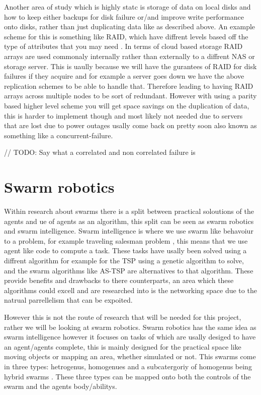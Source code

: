 \documentclass{UoYCSproject}
\begin{document}
Another area of study which is highly statc is storage of data on local disks and how to keep either backups for disk failure or/and improve write performance onto disks, rather than just duplicating data like as described above.
An example scheme for this is something like RAID, which have diffrent levels based off the type of 	attributes that you may need \cite{RAID Levels}.
In terms of cloud based storage RAID arrays are used commonaly internally rather than externally to a diffrent NAS or storage server.
This is uaully because we will have the gurantees of RAID for disk failures if they acquire and for example a server goes down we have the above replication schemes to be able to handle that.
Therefore leading to having RAID arrays across multiple nodes to be sort of redundant.
However with using a parity \cite{Raid parity} based higher level scheme you will get space savings on the duplication of data, this is harder to implement though and most likely not needed due to servers that are lost due to power outages usally come back on pretty soon also known as something like a concurrent-failure.

// TODO: Say what a correlated and non correlated failure is

\section{Swarm robotics}
\label{sec:Robotics}

Within research about swarms there is a split between practical soloutions of the agents and ue of agents as an algorithm, this split can be seen as swarm robotics and swarm intelligence.
Swarm intelligence is where we use swarm like behavoiur to a problem, for example traveling salesman problem \cite{Swarm intellegiegence}, this means that we use agent like code to compute a task.
These tasks have usally been solved using a diffrent algorithm for example for the TSP using a genetic algorithm to solve, and the swarm algorithms like AS-TSP \cite{Swarm intellegiegence} are alternatives to that algorithm.
These provide benefits and drawbacks to there counterparts, an area which these algorithms could excell and are researched into is the networking space due to the natrual parrellelism that can be expoited.

However this is not the route of research that will be needed for this project, rather we will be looking at swarm robotics.
Swarm robotics has the same idea as swarm intelligence however it focuses on tasks of which are usally desiged to have an agent/agents complete, this is mainly designed for the practical space like moving objects or mapping an area, whether simulated or not.
This swarms come in three types: hetrogenus, homogenues and a subcatergoriy of homogenus being hybrid swarms \cite{Swarm robotics reviewed}.
These three types can be mapped onto both the controls of the swarm and the agents body/abilitys.
\end{document}
